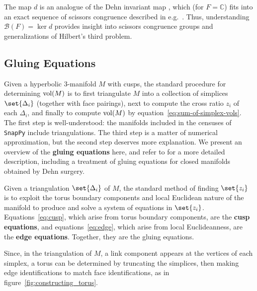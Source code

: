 \documentclass[10pt]{amsart}
\numberwithin{equation}{theorem}
\theoremstyle{definition}
\newcommand{\definedterm}[1]{\textbf{#1}}
\newcommand{\bloch}[1]{\mathcal{B}(#1)}
\newcommand{\prog}[1]{\texttt{#1}}
\begin{document}
The map $d$ is an analogue of the Dehn invariant map
\parencite{neumannhilberts3rd}, which (for $F = \mathbb{C}$) fits into
an exact sequence of scissors congruence described in
e.g.\ \parencite{dupontscissors}. Thus, understanding
$\bloch{F} = \ker d$ provides insight into scissors congruence groups
and generalizations of Hilbert's third problem.

\subsection{Gluing Equations}
\label{subsec:gluing-equations}

Given a hyperbolic 3-manifold $M$ with cusps, the standard procedure
for determining $\operatorname{vol}(M)$ is to first triangulate $M$ into a
collection of simplices $\set{\Delta_i}$ (together with face
pairings), next to compute the cross ratio $z_i$ of each $\Delta_i$,
and finally to compute $\operatorname{vol}(M)$ by
equation~\ref{eq:sum-of-simplex-vols}. The first step is
well-understood: the manifolds included in the censuses of
\prog{SnapPy} include triangulations. The third step is a matter of
numerical approximation, but the second step deserves more
explanation. We present an overview of the \definedterm{gluing
  equations} here, and refer to \parencite{neumann-zagier} for a more
detailed description, including a treatment of gluing equations for
closed manifolds obtained by Dehn surgery.

Given a triangulation $\set{\Delta_i}$ of $M$, the standard method of
finding $\set{z_i}$ is to exploit the torus boundary components and
local Euclidean nature of the manifold to produce and solve a system
of equations in $\set{z_i}$. Equations~\ref{eq:cusp}, which arise from
torus boundary components, are the \definedterm{cusp equations}, and
equations~\ref{eq:edge}, which arise from local Euclideanness, are the
\definedterm{edge equations}. Together, they are the gluing equations.

Since, in the triangulation of $M$, a link component appears at the
vertices of each simplex, a torus can be determined by truncating the
simplices, then making edge identifications to match face
identifications, as in figure~\ref{fig:constructing_torus}.
\end{document}
